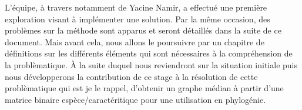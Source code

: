 \bigbreak

L'équipe, à travers notamment de Yacine Namir, a effectué une première exploration \cite{egc2018} visant à implémenter une solution. Par la même occasion, des problèmes sur la méthode sont apparus et seront détaillés dans la suite de ce document. Mais avant cela, nous allons le poursuivre par un chapitre de définitions sur les différents éléments qui sont nécessaires à la compréhension de la problèmatique. À la suite duquel nous reviendront sur la situation initiale puis nous développerons la contribution de ce stage à la résolution de cette problèmatique qui est je le rappel, d'obtenir un graphe médian à partir d'une matrice binaire espèce/caractéritique pour une utilisation en phylogénie.